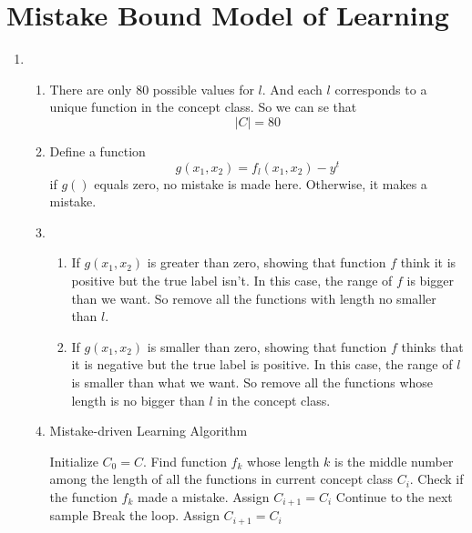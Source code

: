 \documentclass{article}
\begin{document}
	\section{Mistake Bound Model of Learning}
	\begin{enumerate}
		
		\item \begin{enumerate} \item There are only $80$ possible values for $l$. And each $l$ corresponds to a unique function in the concept class. So we can se that 
		\begin{equation}
			|C| = 80
		\end{equation}
		\item Define a function
		\begin{equation}
			g(x_1, x_2) = f_l(x_1,x_2) - y^t
		\end{equation}
		if $g()$ equals zero, no mistake is made here. Otherwise, it makes a mistake.
		\item \begin{enumerate}
		\item If $g(x_1, x_2)$ is greater than zero, showing that function $f$ think it is positive but the true label isn't. In this case, the range of $f$ is bigger than we want. So remove all the functions with length no smaller than $l$.
		\item If $g(x_1, x_2)$ is smaller than zero, showing that function $f$ thinks that it is negative but the true label is positive. In this case, the range of $l$ is smaller than what we want. So remove all the functions whose length is no bigger than $l$ in the concept class.
		\end{enumerate}
		\item \begin{algorithm}[H]
		\caption{Mistake-driven Learning Algorithm}
		\begin{algorithmic}[1]
			\State Initialize $C_0 = C$.
			\State {}
				\State Find function $f_k$ whose length $k$ is the middle number among the length of all the functions in current concept class $C_i$.
				\State Check if the function $f_k$ made a mistake.
				\State {}
					\State Assign $C_{i + 1} = C_{i}$
					\State Continue to the next sample
				 \EndIf
					\State Break the loop.
				\EndIf
				\State Assign $C_{i + 1} = C_i$
            \EndFor
			

\end{algorithmic}
\end{algorithm}
\end{enumerate}
\end{enumerate}
\end{document}
